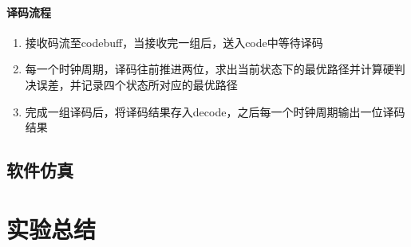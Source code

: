 \documentclass[UTF8]{ctexart}
\begin{document}
\paragraph{译码流程}

\begin{enumerate}
\item 接收码流至codebuff，当接收完一组后，送入code中等待译码
\item 每一个时钟周期，译码往前推进两位，求出当前状态下的最优路径并计算硬判决误差，并记录四个状态所对应的最优路径
\item 完成一组译码后，将译码结果存入decode，之后每一个时钟周期输出一位译码结果
\end{enumerate}

\subsection{软件仿真}

\section{实验总结}
\end{document}
